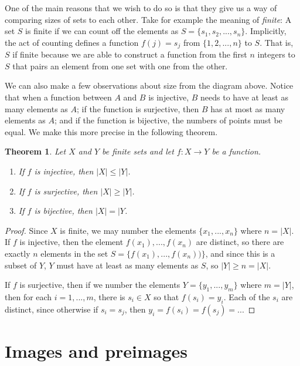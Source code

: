 \documentclass[a4paper,12pt,dvipsnames]{book}
\newtheorem{theorem}{Theorem}
\numberwithin{theorem}{chapter}
\theoremstyle{remark}
\begin{document}
One of the main reasons that we wish to do so is that they give us a way of comparing sizes of sets to each other. Take for example the meaning of {\it finite}: A set $S$ is finite if we can count off the elements as $S=\{s_{1},s_{2},...,s_{n}\}$. Implicitly, the act of counting defines a function $f(j)=s_{j}$ from $\{1,2,...,n\}$ to $S$. That is, $S$ if finite because we are able to construct a function from the first $n$ integers to $S$ that pairs an element from one set with one from the other. 

We can also make a few observations about size from the diagram above. Notice that when a function between $A$ and $B$ is injective, $B$ needs to have at least as many elements as $A$; if the function is surjective, then $B$ has at most as many elements as $A$; and if the function is bijective, the numbers of points must be equal. We make this more precise in the following theorem. 

\begin{theorem}
\label{t:f-size}
Let $X$ and $Y$ be finite sets and let $f:X\rightarrow Y$ be a function. 

\begin{enumerate}
\item If $f$ is injective, then $|X|\leq |Y|$.
\item If $f$ is surjective, then $|X|\geq |Y|$. 
\item If $f$ is bijective, then $|X|=|Y$.
\end{enumerate}
\end{theorem}

\begin{proof}
Since $X$ is finite, we may number the elements $\{x_{1},...,x_{n}\}$ where $n=|X|$. If $f$ is injective, then the element $f(x_{1}),...,f(x_{n})$ are distinct, so there are exactly $n$ elements in the set $S=\{f(x_{1}),...,f(x_{n}))\}$, and since this is a subset of $Y$, $Y$ must have at least as many elements as $S$, so $|Y|\geq n=|X|$. 

If $f$ is surjective, then if we number the elements $Y=\{y_{1},...,y_{m}\}$ where $m=|Y|$, then for each $i=1,...,m$, there is $s_{i}\in X$ so that $f(s_{i})=y_{i}$. Each of the $s_{i}$ are distinct, since otherwise if $s_{i}=s_{j}$, then $y_{i}=f(s_{i})=f(s_{j})=$...

\end{proof}



\section{Images and preimages}
\end{document}
